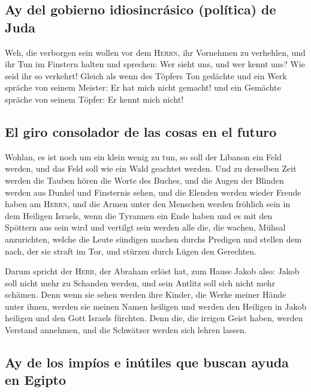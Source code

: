 \hypertarget{ay-del-gobierno-idiosincruxe1sico-poluxedtica-de-juda}{%
\subsection{Ay del gobierno idiosincrásico (política) de
Juda}\label{ay-del-gobierno-idiosincruxe1sico-poluxedtica-de-juda}}

 Weh, die verborgen sein wollen vor dem \textsc{Herrn},
ihr Vornehmen zu verhehlen, und ihr Tun im Finstern halten und sprechen:
Wer sieht uns, und wer kennt uns?  Wie seid ihr so
verkehrt! Gleich als wenn des Töpfers Ton gedächte und ein Werk spräche
von seinem Meister: Er hat mich nicht gemacht! und ein Gemächte spräche
von seinem Töpfer: Er kennt mich nicht!

\hypertarget{el-giro-consolador-de-las-cosas-en-el-futuro}{%
\subsection{El giro consolador de las cosas en el
futuro}\label{el-giro-consolador-de-las-cosas-en-el-futuro}}

 Wohlan, es ist noch um ein klein wenig zu tun, so soll
der Libanon ein Feld werden, und das Feld soll wie ein Wald geachtet
werden.  Und zu derselben Zeit werden die Tauben hören
die Worte des Buches, und die Augen der Blinden werden aus Dunkel und
Finsternis sehen,  und die Elenden werden wieder Freude
haben am \textsc{Herrn}, und die Armen unter den Menschen werden
fröhlich sein in dem Heiligen Israels,  wenn die Tyrannen
ein Ende haben und es mit den Spöttern aus sein wird und vertilgt sein
werden alle die, die wachen, Mühsal anzurichten,  welche
die Leute sündigen machen durchs Predigen und stellen dem nach, der sie
straft im Tor, und stürzen durch Lügen den Gerechten.

 Darum spricht der \textsc{Herr}, der Abraham erlöst hat,
zum Hause Jakob also: Jakob soll nicht mehr zu Schanden werden, und sein
Antlitz soll sich nicht mehr schämen.  Denn wenn sie
sehen werden ihre Kinder, die Werke meiner Hände unter ihnen, werden sie
meinen Namen heiligen und werden den Heiligen in Jakob heiligen und den
Gott Israels fürchten.  Denn die, die irrigen Geist
haben, werden Verstand annehmen, und die Schwätzer werden sich lehren
lassen.

\hypertarget{ay-de-los-impuxedos-e-inuxfatiles-que-buscan-ayuda-en-egipto}{%
\subsection{Ay de los impíos e inútiles que buscan ayuda en
Egipto}\label{ay-de-los-impuxedos-e-inuxfatiles-que-buscan-ayuda-en-egipto}}


